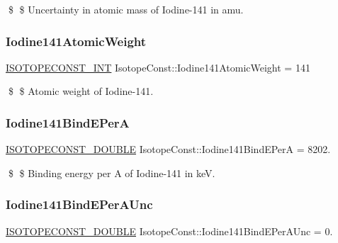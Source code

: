 \$ \$ Uncertainty in atomic mass of Iodine-\/141 in amu. \mbox{\label{group___isotope_const-_iodine-_i141_ga38a2052a3e83c41fa67ee0b27948640c}} 
\subsubsection{\texorpdfstring{Iodine141\+Atomic\+Weight}{Iodine141AtomicWeight}}
{\footnotesize\ttfamily \mbox{\hyperlink{group___isotope_const-_macros_ga5f18360b3e99483a35c32d789e62621c}{I\+S\+O\+T\+O\+P\+E\+C\+O\+N\+S\+T\+\_\+\+I\+NT}} Isotope\+Const\+::\+Iodine141\+Atomic\+Weight = 141}

\$ \$ Atomic weight of Iodine-\/141. \mbox{\label{group___isotope_const-_iodine-_i141_ga965772ab268bdb77a4dec9be714e7165}} 
\subsubsection{\texorpdfstring{Iodine141\+Bind\+E\+PerA}{Iodine141BindEPerA}}
{\footnotesize\ttfamily \mbox{\hyperlink{group___isotope_const-_macros_ga8f45a7272ce02c0b4c65c44636ed719a}{I\+S\+O\+T\+O\+P\+E\+C\+O\+N\+S\+T\+\_\+\+D\+O\+U\+B\+LE}} Isotope\+Const\+::\+Iodine141\+Bind\+E\+PerA = 8202.}

\$ \$ Binding energy per A of Iodine-\/141 in keV. \mbox{\label{group___isotope_const-_iodine-_i141_gaef57d9d54984e861dd2bbd49fe8a2be7}} 
\subsubsection{\texorpdfstring{Iodine141\+Bind\+E\+Per\+A\+Unc}{Iodine141BindEPerAUnc}}
{\footnotesize\ttfamily \mbox{\hyperlink{group___isotope_const-_macros_ga8f45a7272ce02c0b4c65c44636ed719a}{I\+S\+O\+T\+O\+P\+E\+C\+O\+N\+S\+T\+\_\+\+D\+O\+U\+B\+LE}} Isotope\+Const\+::\+Iodine141\+Bind\+E\+Per\+A\+Unc = 0.}

